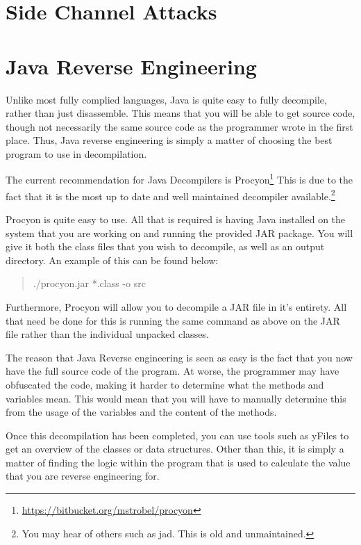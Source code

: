 \documentclass[a4paper,11pt]{report}
\begin{document}
		\section{Side Channel Attacks}
	\section{Java Reverse Engineering}
		Unlike most fully complied languages, Java is quite easy to fully decompile, rather than just disassemble. 
		This means that you will be able to get source code, though not necessarily the same source code as the programmer wrote in the first place. 
		Thus, Java reverse engineering is simply a matter of choosing the best program to use in decompilation. 

		The current recommendation for Java Decompilers is Procyon\footnote{\url{https://bitbucket.org/mstrobel/procyon}}
		This is due to the fact that it is the most up to date and well maintained decompiler available.\footnote{You may hear of others such as jad. This is old and unmaintained.} 
		
		Procyon is quite easy to use. 
		All that is required is having Java installed on the system that you are working on and running the provided JAR package. 
		You will give it both the class files that you wish to decompile, as well as an output directory. 
		An example of this can be found below:
		\begin{quote}
			./procyon.jar *.class -o src
		\end{quote}

		Furthermore, Procyon will allow you to decompile a JAR file in it's entirety. 
		All that need be done for this is running the same command as above on the JAR file rather than the individual unpacked classes. 

		The reason that Java Reverse engineering is seen as easy is the fact that you now have the full source code of the program. 
		At worse, the programmer may have obfuscated the code, making it harder to determine what the methods and variables mean. 
		This would mean that you will have to manually determine this from the usage of the variables and the content of the methods.

		Once this decompilation has been completed, you can use tools such as yFiles to get an overview of the classes or data structures. 
		Other than this, it is simply a matter of finding the logic within the program that is used to calculate the value that you are reverse engineering for. 
	
\end{document}
